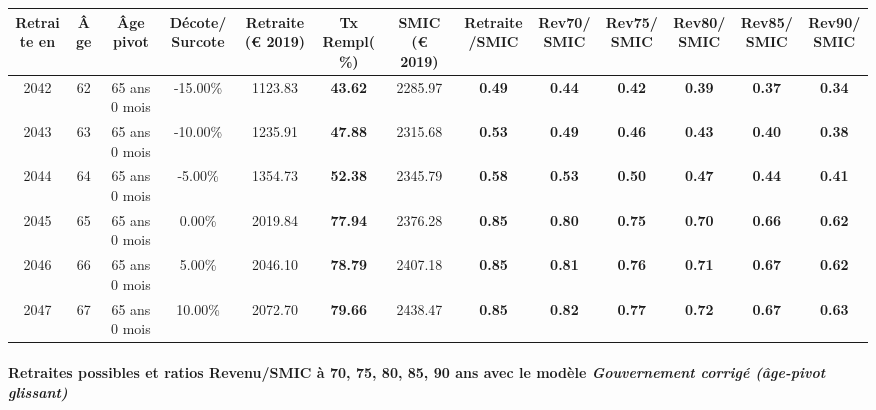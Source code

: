 { \scriptsize \begin{center} 
\begin{tabular}[htb]{|c|c||c|c||c|c||c||c|c|c|c|c|c|} 
\hline 
 Retraite en &  Âge &  Âge pivot &  Décote/Surcote &  Retraite (\euro{} 2019) &  Tx Rempl(\%) &  SMIC (\euro{} 2019) &  Retraite/SMIC &  Rev70/SMIC &  Rev75/SMIC &  Rev80/SMIC &  Rev85/SMIC &  Rev90/SMIC \\ 
\hline \hline 
 2042 &  62 &  65 ans 0 mois &  -15.00\% &  1123.83 &  {\bf 43.62} &  2285.97 &  {\bf {\color{red} 0.49}} &  {\bf {\color{red} 0.44}} &  {\bf {\color{red} 0.42}} &  {\bf {\color{red} 0.39}} &  {\bf {\color{red} 0.37}} &  {\bf {\color{red} 0.34}} \\ 
\hline 
 2043 &  63 &  65 ans 0 mois &  -10.00\% &  1235.91 &  {\bf 47.88} &  2315.68 &  {\bf {\color{red} 0.53}} &  {\bf {\color{red} 0.49}} &  {\bf {\color{red} 0.46}} &  {\bf {\color{red} 0.43}} &  {\bf {\color{red} 0.40}} &  {\bf {\color{red} 0.38}} \\ 
\hline 
 2044 &  64 &  65 ans 0 mois &  -5.00\% &  1354.73 &  {\bf 52.38} &  2345.79 &  {\bf {\color{red} 0.58}} &  {\bf {\color{red} 0.53}} &  {\bf {\color{red} 0.50}} &  {\bf {\color{red} 0.47}} &  {\bf {\color{red} 0.44}} &  {\bf {\color{red} 0.41}} \\ 
\hline 
 2045 &  65 &  65 ans 0 mois &  0.00\% &  2019.84 &  {\bf 77.94} &  2376.28 &  {\bf {\color{red} 0.85}} &  {\bf {\color{red} 0.80}} &  {\bf {\color{red} 0.75}} &  {\bf {\color{red} 0.70}} &  {\bf {\color{red} 0.66}} &  {\bf {\color{red} 0.62}} \\ 
\hline 
 2046 &  66 &  65 ans 0 mois &  5.00\% &  2046.10 &  {\bf 78.79} &  2407.18 &  {\bf {\color{red} 0.85}} &  {\bf {\color{red} 0.81}} &  {\bf {\color{red} 0.76}} &  {\bf {\color{red} 0.71}} &  {\bf {\color{red} 0.67}} &  {\bf {\color{red} 0.62}} \\ 
\hline 
 2047 &  67 &  65 ans 0 mois &  10.00\% &  2072.70 &  {\bf 79.66} &  2438.47 &  {\bf {\color{red} 0.85}} &  {\bf {\color{red} 0.82}} &  {\bf {\color{red} 0.77}} &  {\bf {\color{red} 0.72}} &  {\bf {\color{red} 0.67}} &  {\bf {\color{red} 0.63}} \\ 
\hline 
\hline 
\end{tabular} 
\end{center} } 
\paragraph{Retraites possibles et ratios Revenu/SMIC à 70, 75, 80, 85, 90 ans avec le modèle \emph{Gouvernement corrigé (âge-pivot glissant)}}  
 
